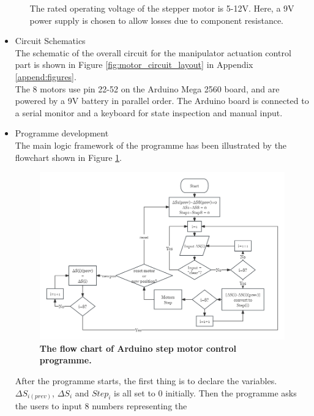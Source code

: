 \begin{itemize}
\begin{itemize}
        The rated operating voltage of the stepper motor is 5-12V. Here, a 9V power supply is chosen to allow 
        losses due to component resistance. 
    \end{itemize}
    \item Circuit Schematics \\
    The schematic of the overall circuit for the manipulator actuation control part is shown in 
    Figure \ref{fig:motor_circuit_layout} in Appendix \ref{append:figures}. \\
    The 8 motors use pin 22-52 on the Arduino Mega 2560 board, and are powered by a 9V battery in parallel order. The Arduino 
    board is connected to a serial monitor and a keyboard for state inspection and manual input.
    \item Programme development \\
    The main logic framework of the programme has been illustrated by the flowchart shown in Figure \ref{fig:motor_flowchart}. 
    \vspace{-5mm}
    \begin{figure}[H] %
        \centering 
        \captionsetup{labelsep=colon}
        \includegraphics[width=1.0\textwidth]{Image/Design/flowchart_arduino_motor.png} 
        \caption[The flow chart of Arduino step motor control programme]
        {\centering \textbf{The flow chart of Arduino step motor control programme.}}
        \label{fig:motor_flowchart}
    \end{figure}
    After the programme starts, the first thing is to declare the variables. $\Delta S_{i(prev)}$, $\Delta S_i$ and 
    $Step_i$ is all set to 0 initially. Then the programme asks the users to input 8 numbers representing the 

\end{itemize}

